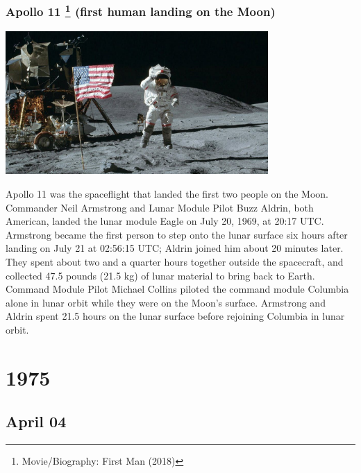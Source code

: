 \documentclass[11pt]{report}
\begin{document}
\subsection{Apollo 11 \protect\footnote{Movie/Biography: First Man (2018)} (first human landing on the Moon)}
\vspace{2mm}\begin{center}\includegraphics[width=10cm]{./img/apollo11.jpg}\end{center}
Apollo 11 was the spaceflight that landed the first two people on the Moon. Commander Neil Armstrong and Lunar Module Pilot Buzz Aldrin, both American, landed the lunar module Eagle on July 20, 1969, at 20:17 UTC. Armstrong became the first person to step onto the lunar surface six hours after landing on July 21 at 02:56:15 UTC; Aldrin joined him about 20 minutes later. They spent about two and a quarter hours together outside the spacecraft, and collected 47.5 pounds (21.5 kg) of lunar material to bring back to Earth. Command Module Pilot Michael Collins piloted the command module Columbia alone in lunar orbit while they were on the Moon's surface. Armstrong and Aldrin spent 21.5 hours on the lunar surface before rejoining Columbia in lunar orbit.

\chapter{1975}
\section{April 04}
\end{document}
